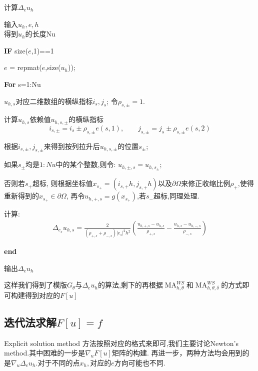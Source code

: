 \documentclass[11pt]{article}
\begin{document}
\begin{algorithm}[H]
\caption{计算$\Delta_eu_h$} 
\begin{algorithmic}[]
\STATE 输入$u_h,e,h$\\

\STATE 得到$u_h$的长度Nu

\STATE \textbf{IF} size($e$,1)==1


\STATE\qquad $e$ = repmat($e$,size($u_h$));
 
\STATE  \textbf{For} s=1:Nu

\STATE\qquad $u_{h,s}$对应二维数组的横纵指标$i_s,j_s$; 令$\rho_{s,\pm}=1.$

\STATE \qquad 计算$u_{h,s}$依赖值$u_{h,s,\pm}$的横纵指标$$i_{s,\pm}=i_s\pm \rho_{s,\pm}e(s,1),\qquad j_{s,\pm}=j_s\pm \rho_{s,\pm}e(s,2)$$

\STATE\qquad 根据$i_{s,\pm},j_{s,\pm}$来得到按列拉升后$u_{h,s,\pm}$的位置$s_{\pm}$;

\STATE \qquad 如果$s_\pm$均是$1:Nu$中的某个整数,则令:
$u_{h,\pm,s}=u_{h,s_\pm}$;

\STATE \qquad 否则若$s_+$超标, 则根据坐标值$x_{s_+}=(i_{s,+}h,j_{s,+}h)$以及$\partial\Omega$来修正收缩比例$\rho_+$,使得重新得到的$x_{s_+}\in \partial\Omega$, 再令$u_{h,+,s}=g(x_{s_+})$,若$s_-$超标,同理处理.

\STATE \qquad 计算:
$$\begin{array}{c}
\Delta_{e_s}u_{h,s} = \frac{2}{\left(\rho_{+,s}+\rho_{-,s}\right)|e_s|^{2} h^{2}}\left(\frac{u_{h,+,s}-u_{h,s}}{\rho_{+,s}}-\frac{u_{h,s}-u_{h,-,s}}{\rho_{-,s}}\right)
\end{array}$$

\STATE \textbf{end}

\STATE 输出$\Delta_eu_h$
\end{algorithmic}
\end{algorithm}

这样我们得到了模版$G_\theta$与$\Delta_eu_h$的算法,剩下的再根据$\operatorname{MA}_{h,\theta}^{WS}$和$\operatorname{MA}_{h,\theta,\delta}^{WS}$的方式即可构建得到对应的$F[u]$

\subsection{迭代法求解$F[u]=f$}
Explicit solution method 方法按照对应的格式来即可,我们主要讨论Newton's method.其中困难的一步是$\nabla{}_uF[u]$矩阵的构建. 再进一步，两种方法均会用到的是$\nabla{}_u\Delta{}_eu_h$.对于不同的点$x_h,$对应的$e$方向可能也不同.
\end{document}
